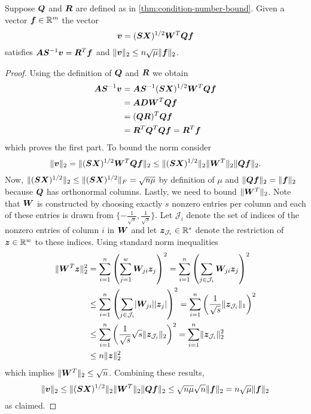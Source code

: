 \begin{theorem}
Suppose \(\bm{Q}\) and \(\bm{R}\) are defined as in \cref{thm:condition-number-bound}. Given a vector \(\bm{f} \in \mathbb{R}^m\) the vector
\[ \bm{v} = (\bm{S}\bm{X})^{1/2} \bm{W}^T \bm{Q} \bm{f} \]
satisfies \( \bm{A}\bm{S}^{-1}\bm{v} = \bm{R}^T \bm{f} \) and \(\lVert \bm{v} \rVert_2 \leq n \sqrt{\mu} \lVert \bm{f} \rVert_2\).
\end{theorem}
\begin{proof}
Using the definition of \(\bm{Q}\) and \(\bm{R}\) we obtain
\begin{align*}
  \bm{A} \bm{S}^{-1} \bm{v}
  &= \bm{A} \bm{S}^{-1} (\bm{S}\bm{X})^{1/2} \bm{W}^T \bm{Q} \bm{f} \\
  &= \bm{A} \bm{D} \bm{W}^T \bm{Q} \bm{f} \\
  &= (\bm{Q} \bm{R})^T \bm{Q} \bm{f} \\
  &= \bm{R}^T \bm{Q}^T \bm{Q} \bm{f} = \bm{R}^T \bm{f}
\end{align*}
which proves the first part.
To bound the norm consider
\[ 
  \lVert \bm{v} \rVert_2
  = \lVert (\bm{S}\bm{X})^{1/2} \bm{W}^T \bm{Q} \bm{f} \rVert_2
  \leq \lVert (\bm{S}\bm{X})^{1/2} \rVert_2 \lVert \bm{W}^T \rVert_2 \lVert \bm{Q} \bm{f} \rVert_2.
\]
Now, \(\lVert (\bm{S}\bm{X})^{1/2} \rVert_2 \leq \lVert (\bm{S}\bm{X})^{1/2} \rVert_F = \sqrt{n \mu}\) by definition of \(\mu\) and \(\lVert \bm{Q}\bm{f} \rVert_2 = \lVert \bm{f} \rVert_2\) because \(\bm{Q}\) has orthonormal columns.
Lastly, we need to bound \(\lVert \bm{W}^T \rVert_2\).
Note that \(\bm{W}\) is constructed by choosing exactly \(s\) nonzero entries per column and each of these entries is drawn from \(\{-\frac{1}{\sqrt{s}}, \frac{1}{\sqrt{s}}\}\).
Let \(\mathcal{J}_i\) denote the set of indices of the nonzero entries of column \(i\) in \(\bm{W}\) and let \(\bm{z}_{\mathcal{J}_i} \in \mathbb{R}^s\) denote the restriction of \(\bm{z} \in \mathbb{R}^w\) to these indices.
Using standard norm inequalities
\begin{align*}
  \lVert \bm{W}^T \bm{z} \rVert_2^2 &= \sum_{i=1}^{n} \left(  \sum_{j=1}^{w} \bm{W}_{ji} \bm{z}_j  \right)^2 = \sum_{i=1}^{n} \left(  \sum_{j \in \mathcal{J}_i} \bm{W}_{ji} \bm{z}_j  \right)^2 \\
  &\leq \sum_{i=1}^{n} \left(  \sum_{j \in \mathcal{J}_i} \lvert \bm{W}_{ji} \rvert \lvert \bm{z}_j \rvert  \right)^2 = \sum_{i=1}^{n} \left(  \frac{1}{\sqrt{s}} \lVert \bm{z}_{\mathcal{J}_i} \rVert_1  \right)^2 \\
  &\leq \sum_{i=1}^{n} \left(  \frac{1}{\sqrt{s}} \sqrt{s} \lVert \bm{z}_{\mathcal{J}_i} \rVert_2  \right)^2 = \sum_{i=1}^{n} \lVert \bm{z}_{\mathcal{J}_i} \rVert_2^2 \\
  &\leq n \lVert \bm{z} \rVert_2^2
\end{align*}
which implies \(\lVert \bm{W}^T \rVert_2 \leq \sqrt{n}\).
Combining these results,
\[ 
  \lVert \bm{v} \rVert_2
  \leq \lVert (\bm{S}\bm{X})^{1/2} \rVert_2 \lVert \bm{W}^T \rVert_2 \lVert \bm{Q} \bm{f} \rVert_2
  \leq \sqrt{n \mu} \sqrt{n} \lVert \bm{f} \rVert_2 = n \sqrt{\mu} \lVert \bm{f} \rVert_2
\]
as claimed.
\end{proof}
